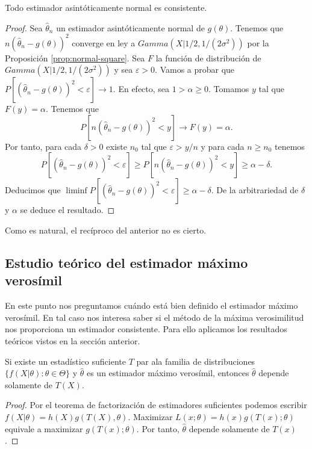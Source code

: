     \begin{prop}
        Todo estimador asintóticamente normal es consistente.
    \end{prop}
    \begin{proof}
        Sea $\hat\theta_n$ un estimador asintóticamente normal de $g(\theta)$. Tenemos que $n (\hat\theta_n - g(\theta))^2$ converge en ley a $Gamma(X|1/2, 1/(2\sigma^2))$ por la Proposición \ref{prop:normal-square}. Sea $F$ la función de distribución de $Gamma(X|1/2, 1/(2\sigma^2))$ y sea $\varepsilon > 0$. Vamos a probar que $P[(\hat\theta_n - g(\theta))^2 < \varepsilon] \to 1$. En efecto, sea $1 > \alpha \ge 0$. Tomamos $y$ tal que $F(y) = \alpha$. Tenemos que
        \[P[n(\hat\theta_n - g(\theta))^2 < y] \to F(y) = \alpha.\]
        Por tanto, para cada $\delta > 0$ existe $n_0$ tal que $\varepsilon > y /n$ y para cada $n \ge n_0$ tenemos
        \[P[(\hat\theta_n - g(\theta))^2 < \varepsilon] \ge P[n(\hat\theta_n - g(\theta))^2 < y] \ge \alpha - \delta.\]
        Deducimos que $\liminf P[(\hat\theta_n - g(\theta))^2 < \varepsilon] \ge \alpha - \delta.$ De la arbitrariedad de $\delta$ y $\alpha$ se deduce el resultado.
    \end{proof}

    Como es natural, el recíproco del anterior no es cierto.

    \subsection{Estudio teórico del estimador máximo verosímil}

    En este punto nos preguntamos cuándo está bien definido el estimador máximo verosímil. En tal caso nos interesa saber si el método de la máxima verosimilitud nos proporciona un estimador consistente. Para ello aplicamos los resultados teóricos vistos en la sección anterior.

    \begin{prop}
        Si existe un estadístico suficiente $T$ par ala familia de distribuciones $\{f(X|\theta): \theta \in \Theta\}$ y $\hat\theta$ es un estimador máximo verosímil, entonces $\hat\theta$ depende solamente de $T(X)$.
    \end{prop}
    \begin{proof}
        Por el teorema de factorización de estimadores suficientes podemos escribir $f(X|\theta) = h(X) g(T(X), \theta)$. Maximizar $L(x; \theta) = h(x) g(T(x); \theta)$ equivale a maximizar $g(T(x); \theta)$. Por tanto, $\hat\theta$ depende solamente de $T(x)$.
    \end{proof}

